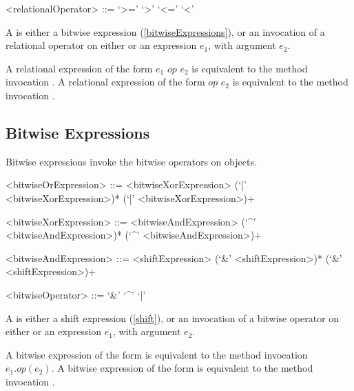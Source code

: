 \documentclass[makeidx]{article}
\begin{document}
{\begin{grammar}
<relationalOperator> ::= `>='
  \alt `>'
  \alt `<='
  \alt `<'
\end{grammar}

\LMHash{}%
A  is either a bitwise expression
(\ref{bitwiseExpressions}),
or an invocation of a relational operator on either \SUPER{}
or an expression $e_1$, with argument $e_2$.

\LMHash{}%
A relational expression of the form $e_1$ $op$ $e_2$ is equivalent to
the method invocation .
A relational expression of the form \SUPER{} $op$ $e_2$ is equivalent to
the method invocation .


\subsection{Bitwise Expressions}

\LMHash{}%
Bitwise expressions invoke the bitwise operators on objects.

\begin{grammar}
<bitwiseOrExpression> ::= \gnewline{}
  <bitwiseXorExpression> (`|' <bitwiseXorExpression>)*
  \alt \SUPER{} (`|' <bitwiseXorExpression>)+

<bitwiseXorExpression> ::= \gnewline{}
  <bitwiseAndExpression> (`^' <bitwiseAndExpression>)*
  \alt \SUPER{} (`^' <bitwiseAndExpression>)+

<bitwiseAndExpression> ::= <shiftExpression> (`\&' <shiftExpression>)*
  \alt \SUPER{} (`\&' <shiftExpression>)+

<bitwiseOperator> ::= `\&'
  \alt `^'
  \alt `|'
\end{grammar}

\LMHash{}%
A  is either a shift expression (\ref{shift}),
or an invocation of a bitwise operator
on either \SUPER{} or an expression $e_1$,
with argument $e_2$.

\LMHash{}%
A bitwise expression of the form  is equivalent to
the method invocation $e_1.op(e_2)$.
A bitwise expression of the form  is equivalent to
the method invocation .



}
\end{document}
